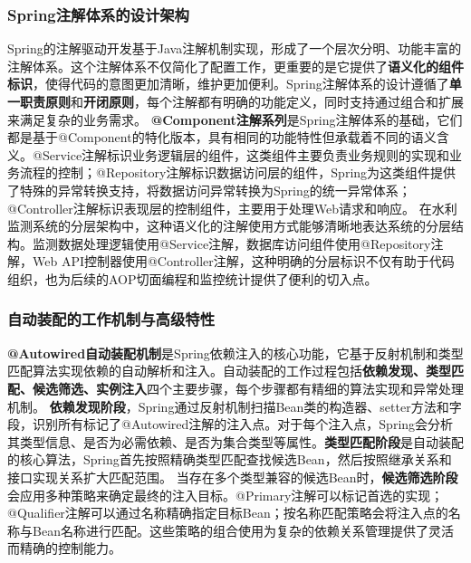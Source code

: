\subsubsection{Spring注解体系的设计架构}\label{springux6ce8ux89e3ux4f53ux7cfbux7684ux8bbeux8ba1ux67b6ux6784}
Spring的注解驱动开发基于Java注解机制实现，形成了一个层次分明、功能丰富的注解体系。这个注解体系不仅简化了配置工作，更重要的是它提供了\textbf{语义化的组件标识}，使得代码的意图更加清晰，维护更加便利。Spring注解体系的设计遵循了\textbf{单一职责原则}和\textbf{开闭原则}，每个注解都有明确的功能定义，同时支持通过组合和扩展来满足复杂的业务需求。
\textbf{@Component注解系列}是Spring注解体系的基础，它们都是基于@Component的特化版本，具有相同的功能特性但承载着不同的语义含义。@Service注解标识业务逻辑层的组件，这类组件主要负责业务规则的实现和业务流程的控制；@Repository注解标识数据访问层的组件，Spring为这类组件提供了特殊的异常转换支持，将数据访问异常转换为Spring的统一异常体系；@Controller注解标识表现层的控制组件，主要用于处理Web请求和响应。
在水利监测系统的分层架构中，这种语义化的注解使用方式能够清晰地表达系统的分层结构。监测数据处理逻辑使用@Service注解，数据库访问组件使用@Repository注解，Web
API控制器使用@Controller注解，这种明确的分层标识不仅有助于代码组织，也为后续的AOP切面编程和监控统计提供了便利的切入点。
\subsubsection{自动装配的工作机制与高级特性}\label{ux81eaux52a8ux88c5ux914dux7684ux5de5ux4f5cux673aux5236ux4e0eux9ad8ux7ea7ux7279ux6027}
\textbf{@Autowired自动装配机制}是Spring依赖注入的核心功能，它基于反射机制和类型匹配算法实现依赖的自动解析和注入。自动装配的工作过程包括\textbf{依赖发现、类型匹配、候选筛选、实例注入}四个主要步骤，每个步骤都有精细的算法实现和异常处理机制。
\textbf{依赖发现阶段}，Spring通过反射机制扫描Bean类的构造器、setter方法和字段，识别所有标记了@Autowired注解的注入点。对于每个注入点，Spring会分析其类型信息、是否为必需依赖、是否为集合类型等属性。\textbf{类型匹配阶段}是自动装配的核心算法，Spring首先按照精确类型匹配查找候选Bean，然后按照继承关系和接口实现关系扩大匹配范围。
当存在多个类型兼容的候选Bean时，\textbf{候选筛选阶段}会应用多种策略来确定最终的注入目标。@Primary注解可以标记首选的实现；@Qualifier注解可以通过名称精确指定目标Bean；按名称匹配策略会将注入点的名称与Bean名称进行匹配。这些策略的组合使用为复杂的依赖关系管理提供了灵活而精确的控制能力。
\begin{lstlisting}[language=Java] \end{lstlisting}
